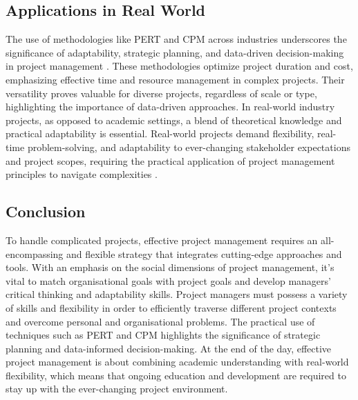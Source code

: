 \documentclass{article}
\begin{document}
\subsection{Applications in Real World}
The use of methodologies like PERT and CPM across industries underscores the significance of adaptability, strategic planning, and data-driven decision-making in project management \cite{cicmil2006rethinking}. These methodologies optimize project duration and cost, emphasizing effective time and resource management in complex projects. Their versatility proves valuable for diverse projects, regardless of scale or type, highlighting the importance of data-driven approaches. In real-world industry projects, as opposed to academic settings, a blend of theoretical knowledge and practical adaptability is essential. Real-world projects demand flexibility, real-time problem-solving, and adaptability to ever-changing stakeholder expectations and project scopes, requiring the practical application of project management principles to navigate complexities \cite{toor2009ineffective}.

\subsection{Conclusion}

To handle complicated projects, effective project management requires an all-encompassing and flexible strategy that integrates cutting-edge approaches and tools. With an emphasis on the social dimensions of project management, it's vital to match organisational goals with project goals and develop managers' critical thinking and adaptability skills. Project managers must possess a variety of skills and flexibility in order to efficiently traverse different project contexts and overcome personal and organisational problems. The practical use of techniques such as PERT and CPM highlights the significance of strategic planning and data-informed decision-making. At the end of the day, effective project management is about combining academic understanding with real-world flexibility, which means that ongoing education and development are required to stay up with the ever-changing project environment.









\end{document}
